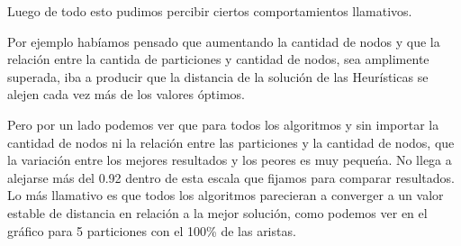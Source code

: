 Luego de todo esto pudimos percibir ciertos comportamientos llamativos.

Por ejemplo hab\'iamos pensado que aumentando la cantidad de nodos y que la relaci\'on entre la cantida de particiones y cantidad de nodos, sea amplimente superada, iba a producir que la distancia de la soluci\'on de las Heur\'isticas se alejen cada vez m\'as de los valores \'optimos.

Pero por un lado podemos ver que para todos los algoritmos y sin importar la cantidad de nodos ni la relaci\'on entre las particiones y la cantidad de nodos, que la variaci\'on entre los mejores resultados y los peores es muy peque\'na. No llega a alejarse m\'as del 0.92 dentro de esta escala que fijamos para comparar resultados.\\

Lo m\'as llamativo es que todos los algoritmos parecieran a converger a un valor estable de distancia en relaci\'on a la mejor soluci\'on, como podemos ver en el gr\'afico para 5 particiones con el 100\% de las aristas.